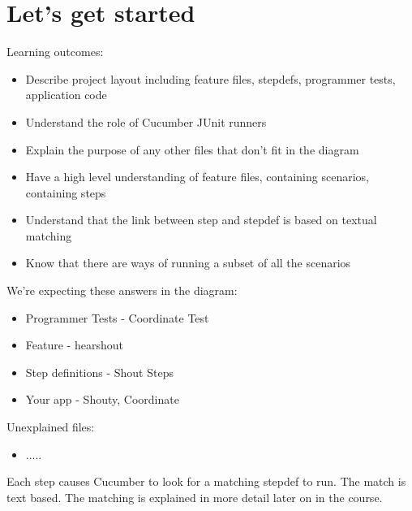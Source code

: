 \chapter*{Let's get started}

\ifnotes

    Learning outcomes:
    
    \begin{itemize}
        \item Describe project layout including feature files, stepdefs, programmer tests, application code
        \item Understand the role of Cucumber JUnit runners
        \item Explain the purpose of any other files that don't fit in the diagram
        \item Have a high level understanding of feature files, containing scenarios, containing steps
        \item Understand that the link between step and stepdef is based on textual matching
        \item Know that there are ways of running a subset of all the scenarios
    \end{itemize}
    
    We're expecting these answers in the diagram:
    \begin{itemize}
        \item Programmer Tests - Coordinate Test
        \item Feature - hear\textunderscore shout
        \item Step definitions - Shout Steps
        \item Your app - Shouty, Coordinate
    \end{itemize}
    
    Unexplained files:
    \begin{itemize}
        
        \item .....
    \end{itemize}
    
    Each step causes Cucumber to look for a matching stepdef to run. The match is text based. The matching is explained in more detail later on in the course.
    

